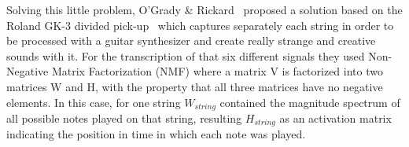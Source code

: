 Solving this little problem, O'Grady \& Rickard~\cite{OGrady2009} proposed a solution based on the Roland GK-3 divided pick-up~\cite{gk3} which captures separately each string in order to be processed with a guitar synthesizer and create really strange and creative sounds with it. For the transcription of that six different signals they used Non-Negative Matrix Factorization (NMF) where a matrix V is factorized into two matrices W and H, with the property that all three matrices have no negative elements. In this case, for one string $W_{string}$ contained the magnitude spectrum of all possible notes played on that string, resulting $H_{string}$ as an activation matrix indicating the position in time in which each note was played.


\cleardoublepage